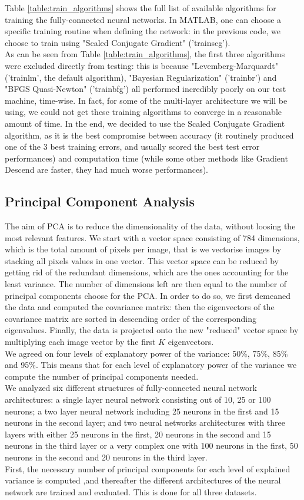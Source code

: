 \documentclass[letterpaper,12pt]{article}
\begin{document}
Table \ref{table:train_algorithms} shows the full list of available algorithms for training the fully-connected neural networks. In MATLAB, one can choose a specific training routine when defining the network: in the previous code, we choose to train using "Scaled Conjugate Gradient" ('trainscg'). \\
As can be seen from Table \ref{table:train_algorithms}, the first three algorithms were excluded directly from testing: this is because "Levemberg-Marquardt" ('trainlm', the default algorithm), "Bayesian Regularization" ('trainbr') and "BFGS Quasi-Newton" ('trainbfg') all performed incredibly poorly on our test machine, time-wise. In fact, for some of the multi-layer architecture we will be using, we could not get these training algorithms to converge in a reasonable amount of time. In the end, we decided to use the Scaled Conjugate Gradient algorithm, as it is the best compromise between accuracy (it routinely produced one of the 3 best training errors, and usually scored the best test error performances) and computation time (while some other methods like Gradient Descend are faster, they had much worse performances).

\subsection*{Principal Component Analysis}
The aim of PCA is to reduce the dimensionality of the data, without loosing the most relevant features. We start with a vector space consisting of 784 dimensions, which is the total amount of pixels per image, that is we vectorise images by stacking all pixels values in one vector. This vector space can be reduced by getting rid of the redundant dimensions, which are the ones accounting for the least variance. The number of dimensions left are then equal to the number of principal components choose for the PCA. In order to do so, we first demeaned the data and computed the covariance matrix: then the eigenvectors of the covariance matrix are sorted in descending order of the corresponding eigenvalues. Finally, the data is projected onto the new "reduced" vector space by multiplying each image vector by the first $K$ eigenvectors.\\
We agreed on four levels of explanatory power of the variance: 50\%, 75\%, 85\% and 95\%. This means that for each level of explanatory power of the variance we compute the number of principal components needed.\\
We analyzed six different structures of fully-connected neural network architectures: a single layer neural network consisting out of 10, 25 or 100 neurons; a two layer neural network including 25 neurons in the first and 15 neurons in the second layer; and two neural networks architectures with three layers with either 25 neurons in the first, 20 neurons in the second and 15 neurons in the third layer or a very complex one with 100 neurons in the first, 50 neurons in the second and 20 neurons in the third layer.\\
First, the necessary number of principal components for each level of explained variance is computed ,and thereafter the different architectures of the neural network are trained and evaluated. This is done for all three datasets. 
\end{document}
